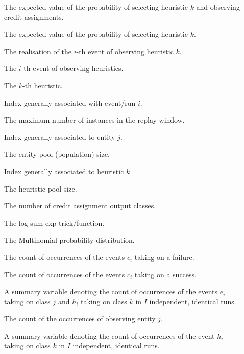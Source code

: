 \begin{description}
	\item [\parbox{2cm}{$E[\psi_{k}]$}] \parbox{12.5cm}{The expected value of the probability of selecting heuristic $k$ and observing credit assignments.}
	\item [\parbox{2cm}{$E[\theta_{k}]$}] \parbox{12.5cm}{The expected value of the probability of selecting heuristic $k$.}
	\item [\parbox{2cm}{$h_{i,k}$}] \parbox{12.5cm}{The realisation of the $i$-th event of observing heuristic $k$.}
	\item [\parbox{2cm}{$h_{i}$}] \parbox{12.5cm}{The $i$-th event of observing heuristics.}
	\item [\parbox{2cm}{$h_{k}$}] \parbox{12.5cm}{The $k$-th heuristic.}
	\item [\parbox{2cm}{$i$}] \parbox{12.5cm}{Index generally associated with event/run $i$.}
	\item [\parbox{2cm}{$I$}] \parbox{12.5cm}{The maximum number of instances in the replay window.}
	\item [\parbox{2cm}{$j$}] \parbox{12.5cm}{Index generally associated to entity $j$.}
	\item [\parbox{2cm}{$J$}] \parbox{12.5cm}{The entity pool (population) size.}
	\item [\parbox{2cm}{$k$}] \parbox{12.5cm}{Index generally associated to heuristic $k$.}
	\item [\parbox{2cm}{$K$}] \parbox{12.5cm}{The heuristic pool size.}
	\item [\parbox{2cm}{$L$}] \parbox{12.5cm}{The number of credit assignment output classes.}
	\item [\parbox{2cm}{$LSE$}] \parbox{12.5cm}{The log-sum-exp trick/function.}
	\item [\parbox{2cm}{$Mult$}] \parbox{12.5cm}{The Multinomial probability distribution.}
	\item [\parbox{2cm}{$N_{0,k}$}] \parbox{12.5cm}{The count of occurrences of the events $c_{i}$ taking on a failure.}
	\item [\parbox{2cm}{$N_{1,k}$}] \parbox{12.5cm}{The count of occurrences of the events $c_{i}$ taking on a success.}
	\item [\parbox{2cm}{$N_{j,k}$}] \parbox{12.5cm}{A summary variable denoting the count of occurrences of the events $e_{i}$ taking on class $j$ and $h_{i}$ taking on class $k$ in $I$ independent, identical runs.}
	\item [\parbox{2cm}{$N_{j}$}] \parbox{12.5cm}{The count of the occurrences of observing entity $j$.}
	\item [\parbox{2cm}{$N_{k}$}] \parbox{12.5cm}{A summary variable denoting the count of occurrences of the event $h_{i}$ taking on class $k$ in $I$ independent, identical runs.}

\end{description}

